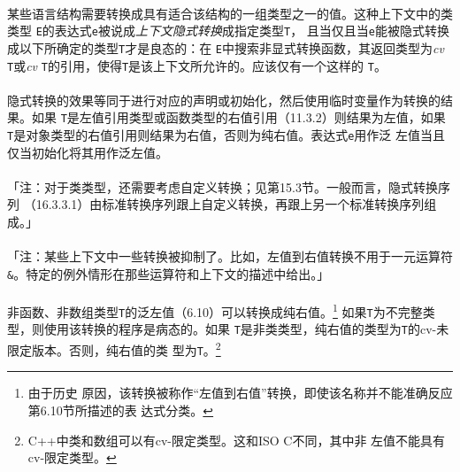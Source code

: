 \paragraph{}
某些语言结构需要转换成具有适合该结构的一组类型之一的值。这种上下文中的类类型
\texttt{E}的表达式\texttt{e}被说成\textit{上下文隐式转换}成指定类型\texttt{T}，
且当仅且当\texttt{e}能被隐式转换成以下所确定的类型\texttt{T}才是良态的：在
\texttt{E}中搜索非显式转换函数，其返回类型为\textit{cv} \texttt{T}或\textit{cv}
\texttt{T}的引用，使得\texttt{T}是该上下文所允许的。应该仅有一个这样的
\texttt{T}。

\paragraph{}
隐式转换的效果等同于进行对应的声明或初始化，然后使用临时变量作为转换的结果。如果
\texttt{T}是左值引用类型或函数类型的右值引用（11.3.2）则结果为左值，如果
\texttt{T}是对象类型的右值引用则结果为右值，否则为纯右值。表达式\texttt{e}用作泛
左值当且仅当初始化将其用作泛左值。

\paragraph{}
「注：对于类类型，还需要考虑自定义转换；见第15.3节。一般而言，隐式转换序列
（16.3.3.1）由标准转换序列跟上自定义转换，再跟上另一个标准转换序列组成。」

\paragraph{}
「注：某些上下文中一些转换被抑制了。比如，左值到右值转换不用于一元运算符
\texttt{\&}。特定的例外情形在那些运算符和上下文的描述中给出。」

\paragraph{}
非函数、非数组类型\texttt{T}的泛左值（6.10）可以转换成纯右值。\footnote{由于历史
原因，该转换被称作``左值到右值''转换，即使该名称并不能准确反应第6.10节所描述的表
达式分类。} 如果\texttt{T}为不完整类型，则使用该转换的程序是病态的。如果
\texttt{T}是非类类型，纯右值的类型为\texttt{T}的cv-未限定版本。否则，纯右值的类
型为\texttt{T}。\footnote{C++中类和数组可以有cv-限定类型。这和ISO C不同，其中非
左值不能具有cv-限定类型。}

